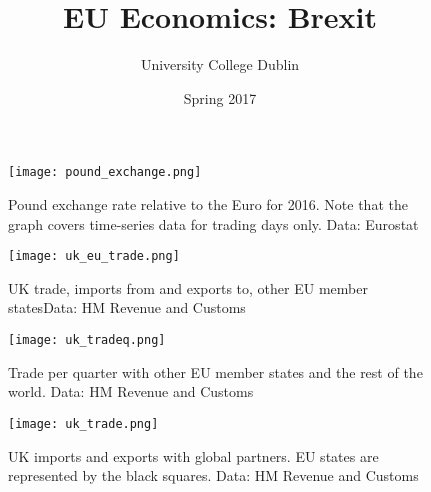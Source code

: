 \documentclass{tufte-handout}
\title{EU Economics: Brexit}
\author{University College Dublin}
\date{Spring 2017}
\begin{document}
\maketitle  

\begin{figure} \centering
    \texttt{[image: pound\_exchange.png]}
    \caption{Pound exchange rate relative to the Euro for 2016. Note that the graph covers time-series data for trading days only. Data: Eurostat}
    \label{fig:pound}
  \end{figure}

\begin{figure} \centering
    \texttt{[image: uk\_eu\_trade.png]}
    \caption{UK trade, imports from and exports to, other EU member statesData: HM Revenue and Customs}
    \label{fig:uk_trade1}
  \end{figure}

\begin{figure} \centering
    \texttt{[image: uk\_tradeq.png]}
    \caption{Trade per quarter with other EU member states and the rest of the world. Data: HM Revenue and Customs}
    \label{fig:uk_trade2}
  \end{figure}


\begin{figure} \centering
    \texttt{[image: uk\_trade.png]}
    \caption{UK imports and exports with global partners. EU states are represented by the black squares. Data: HM Revenue and Customs}
    \label{fig:uk_trade3}
  \end{figure}
\end{document}
